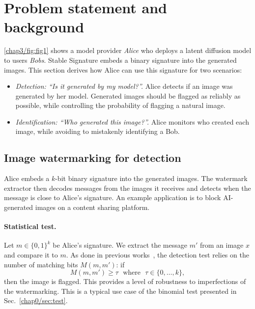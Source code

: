 

\section{Problem statement and background}

\autoref{chap3/fig:fig1} shows a model provider \emph{Alice} who deploys a latent diffusion model to users \emph{Bobs}.
Stable Signature embeds a binary signature into the generated images. 
This section derives how Alice can use this signature for two scenarios:
\begin{itemize}
    \item 
    \emph{Detection: ``Is it generated by my model?''.} 
    Alice detects if an image was generated by her model.
    Generated images should be flagged as reliably as possible, while controlling the probability of flagging a natural image. 
    \item 
    \emph{Identification: ``Who generated this image?''.} 
    Alice monitors who created each image, while avoiding to mistakenly identifying a Bob. %
\end{itemize}

\subsection{Image watermarking for detection}
Alice embeds a $k$-bit binary signature into the generated images.
The watermark extractor then decodes messages from the images it receives and detects when the message is close to Alice's signature.
An example application is to block AI-generated images on a content sharing platform. 


\paragraph{Statistical test.}\label{chap3/subsec:statistical-test}
Let $m\in \{ 0,1 \}^{k}$ be Alice's signature. 
We extract the message $m'$ from an image $x$ and compare it to $m$.
As done in previous works~\citep{lin2022cycleganwm, yu2021artificial},
the detection test relies on the number of matching bits $M(m,m')$: if
\begin{equation} 
M\left(m,m'\right) \geq \tau \,\,\textrm{ where }\,\, \tau\in \{0,\ldots,k\},
\label{chap3/eq:detectiontest}
\end{equation}
then the image is flagged.
This provides a level of robustness to imperfections of the watermarking. 
This is a typical use case of the binomial test presented in Sec.~\ref{chap0/sec:test}.

